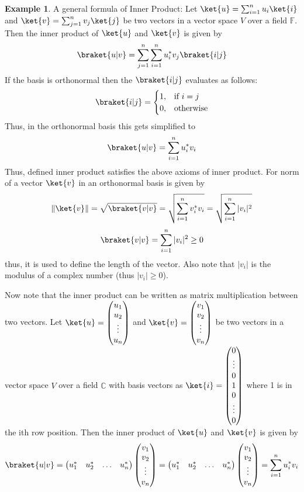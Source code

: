 \documentclass[12pt, oneside]{book}
\theoremstyle{definition}
\theoremstyle{definition}
\newtheorem{example}{Example}[section]
\theoremstyle{remark}
\begin{document}
\begin{example}
    A general formula of Inner Product: Let $\ket{u}=\sum_{i=1}^{n}u_i\ket{i}$ and $\ket{v}=\sum_{j=1}^{n}v_j\ket{j}$ be two vectors in a vector space $V$ over a field $\mathbb{F}$. Then the inner product of $\ket{u}$ and $\ket{v}$ is given by
    \[
        \braket{u|v}=\sum_{j=1}^{n} \sum_{i=1}^{n}u_i^*v_j \braket{i|j}
    \]
    If the basis is orthonormal then the $\braket{i|j}$ evaluates as follows:
    \[
    \braket{i|j}= 
\begin{cases}
    1, & \text{if } i=j\\
    0, & \text{otherwise}
\end{cases}
\]
Thus, in the orthonormal basis this gets simplified to 
\[ \braket{u|v}=\sum_{i=1}^{n}u_i^*v_i \]
Thus, defined inner product satisfies the above axioms of inner product.
For norm of a vector $\ket{v}$ in an orthonormal basis is given by
\[
    \|\ket{v}\|=\sqrt{\braket{v|v}}=\sqrt{\sum_{i=1}^{n}v_i^*v_i}=\sqrt{\sum_{i=1}^{n}|v_i|^2}
\]
\[ \braket{v|v}=\sum_{i=1}^{n}|v_i|^2 \geq 0 \]
thus, it is used to define the length of the vector. Also note that $|v_i|$ is the modulus of a complex number (thus $|v_i| \geq 0$).
\end{example}
Now note that the inner product can be written as matrix multiplication between two vectors. Let $\ket{u}=\begin{pmatrix} u_1 \\ u_2 \\ \vdots \\ u_n \end{pmatrix}$ 
and $\ket{v}=\begin{pmatrix} v_1 \\ v_2 \\ \vdots \\ v_n \end{pmatrix}$ be two vectors in a 
vector space $V$ over a field $\mathbb{C}$ with basis vectors as $\ket{i}=\begin{pmatrix} 0 \\ \vdots \\ 0 \\ 1 \\ 0 \\ \vdots \\ 0 \end{pmatrix}$ where 1 is in the ith row position. Then the inner product of $\ket{u}$ and $\ket{v}$ is given by
\[
    \braket{u|v}=\begin{pmatrix} u_1^* & u_2^* & \ldots & u_n^* \end{pmatrix} \begin{pmatrix} v_1 \\ v_2 \\ \vdots \\ v_n \end{pmatrix}=\begin{pmatrix} u_1^* & u_2^* & \ldots & u_n^* \end{pmatrix} \begin{pmatrix} v_1 \\ v_2 \\ \vdots \\ v_n \end{pmatrix}=\sum_{i=1}^{n}u_i^*v_i
\]
\end{document}
